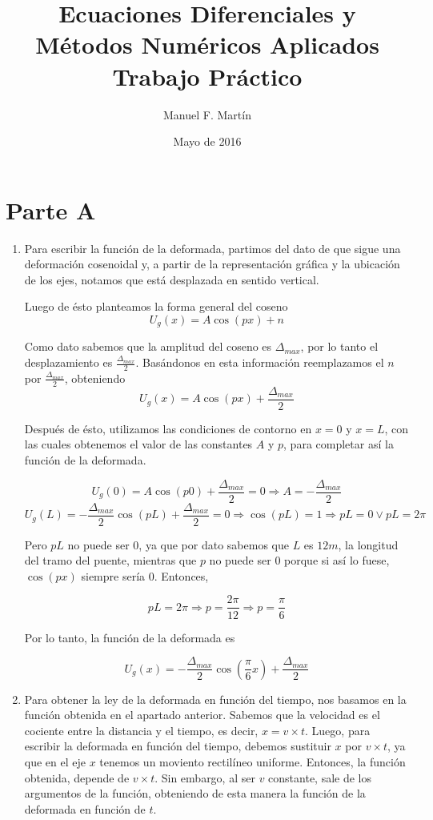 \documentclass[10.5pt]{article}
\begin{document}
\date{Mayo de 2016}
\title{Ecuaciones Diferenciales y\\Métodos Numéricos Aplicados\\Trabajo Práctico}
\author{Manuel F. Martín}

\maketitle


\section*{Parte A}

\begin{enumerate}
 
 \item Para escribir la función de la deformada, partimos del dato de que sigue una deformación cosenoidal y,
a partir de la representación gráfica y la ubicación de los ejes, notamos que está desplazada en sentido vertical.

Luego de ésto planteamos la forma general del coseno \[U_g(x) = A \cos (px) + n\]

Como dato sabemos que la amplitud del coseno es
$\Delta_{max}$, por lo tanto el desplazamiento es $\frac{\Delta_{max}}{2}$. Basándonos en esta información reemplazamos el $n$ por
$\frac{\Delta_{max}}{2}$, obteniendo \[U_g(x) = A \cos (px) + \frac{\Delta_{max}}{2}\]

Después de ésto, utilizamos las condiciones de contorno en $x = 0$ y $ x = L$, con las cuales obtenemos el valor de las constantes
$A$ y $p$, para completar así la función de la deformada.

\[U_g(0) = A \cos (p0) + \frac{\Delta_{max}}{2} = 0 \Rightarrow A = -\frac{\Delta_{max}}{2}\]
\[U_g(L) = -\frac{\Delta_{max}}{2} \cos (pL) + \frac{\Delta_{max}}{2} = 0 \Rightarrow \cos (pL) = 1 \Rightarrow pL = 0 \vee pL = 2\pi\]

Pero $pL$ no puede ser $0$, ya que por dato sabemos que $L$ es $12m$, la longitud del tramo del puente,
mientras que $p$ no puede ser $0$ porque si así lo fuese, $\cos(px)$ siempre sería $0$. Entonces,

\[ pL = 2\pi \Rightarrow p = \frac{2\pi}{12} \Rightarrow p = \frac{\pi}{6} \]

Por lo tanto, la función de la deformada es 

\[U_g(x) = -\frac{\Delta_{max}}{2}  \cos (\frac{\pi}{6}x) + \frac{\Delta_{max}}{2} \]

 \item Para obtener la ley de la deformada en función del tiempo, nos basamos en la función obtenida en el apartado anterior.
Sabemos que la velocidad es el cociente entre la distancia y el tiempo, es decir, $x = v \times t$. Luego, para escribir la deformada
en función del tiempo, debemos sustituir $x$ por $v \times t$, ya que en el eje $x$ tenemos un moviento rectilíneo uniforme.
Entonces, la función obtenida, depende de $v \times t$. Sin embargo, al ser $v$ constante, sale de los argumentos de la función,
obteniendo de esta manera la función de la deformada en función de $t$.


\end{enumerate}
\end{document}
